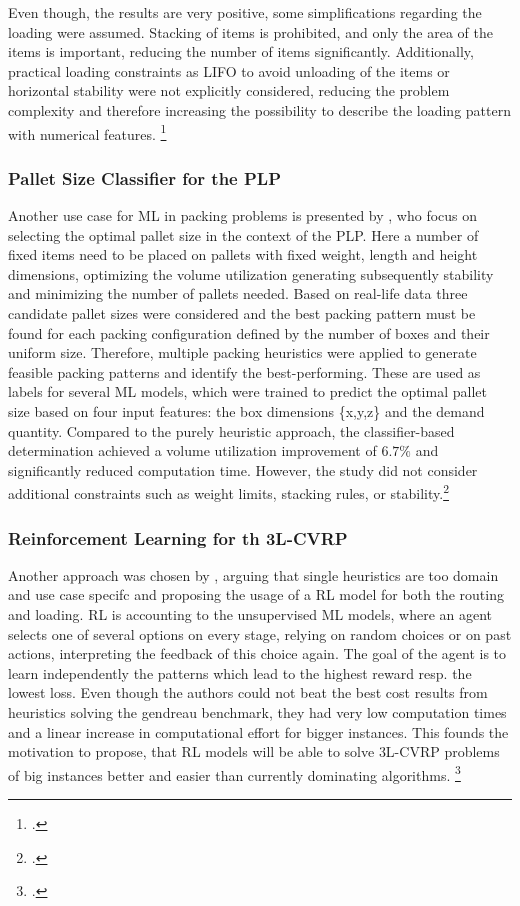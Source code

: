 Even though, the results are very positive, some simplifications regarding the loading were assumed. Stacking
of items is prohibited, and only the area of the items is important, reducing the number of items significantly.
Additionally, practical loading constraints as \gls{LIFO} to avoid unloading of the items or horizontal stability
were not explicitly considered, reducing the problem complexity and therefore increasing the possibility to describe
the loading pattern with numerical features. \footcite[cf.][]{zhang_learning-based_2022}

\subsubsection{Pallet Size Classifier for the \gls{PLP}}
Another use case for \gls{ML} in packing problems is presented by \textcite{aylak_application_2021},
who focus on selecting the optimal pallet size in the context of the \gls{PLP}. Here a number of fixed items
need to be placed on pallets with fixed weight, length and height dimensions, optimizing the volume utilization
generating subsequently stability and minimizing the number of pallets needed. Based on real-life data
three candidate pallet sizes were considered and the best packing pattern must be found for each packing
configuration defined by the number of boxes and their uniform size. Therefore, multiple packing heuristics were applied to
generate feasible packing patterns and identify the best-performing. These are used as labels for several
\gls{ML} models, which were trained to predict the optimal pallet size based on four input features: the box
dimensions \{x,y,z\} and the demand quantity. Compared to the purely heuristic approach, the classifier-based
determination achieved a volume utilization improvement of $6.7\%$ and significantly reduced computation time.
However, the study did not consider additional constraints such as weight limits, stacking rules, or stability.\footcite[cf.][pp. 12--14]{aylak_application_2021}

\subsubsection{Reinforcement Learning for th \gls{3L-CVRP}}
Another approach was chosen by \cite{schoepf_using_2024}, arguing that single heuristics are too domain and use
case specifc and proposing the usage of a \gls{RL} model for both the routing and loading. \gls{RL} is accounting
to the unsupervised \gls{ML} models, where an agent selects one of several options on every stage, relying on random choices or
on past actions, interpreting the feedback of this choice again. The goal of the agent is to learn independently
the patterns which lead to the highest reward resp. the lowest loss. Even though the authors could not beat
the best cost results from heuristics solving the gendreau benchmark, they had very low computation times and
a linear increase in computational effort for bigger instances. This founds the motivation to propose, that \gls{RL}
models will be able to solve \gls{3L-CVRP} problems of big instances better and easier than currently dominating
algorithms. \footcite[cf.][]{schoepf_using_2024}

